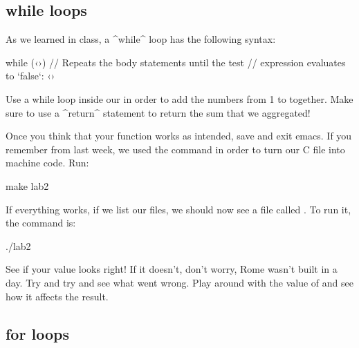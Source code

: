 \documentclass{tufte-handout}
\begin{document}
\subsection{{\codeKeywordstyle while} loops} As we learned in class, a  ^while^
loop has the following syntax:

\begin{Code}
    while (‹›) {
        // Repeats the body statements until the test
        // expression evaluates to `false`:
        ‹›
    }
\end{Code}


Use a while loop inside our  in order to
add the numbers from 1 to  together. Make sure to
use a ^return^ statement to return the sum that we aggregated!

Once you think that your function works as intended, save and exit
emacs. If you remember from last week, we used the 
command in order to turn our C file into machine code. Run:

\begin{CmdLine*}
  \C make lab2\\
\end{CmdLine*}

If everything works, if we list our files, we should now see a file
called . To run it, the command is:

\begin{CmdLine*}
  \C ./lab2\\
\end{CmdLine*}

See if your value looks right!  If it doesn't, don't worry, Rome wasn't
built in a day.  Try and try and see what went wrong.  Play around with the value of  and see
how it affects the result.

\subsection{{\codeKeywordstyle for} loops}
\end{document}
